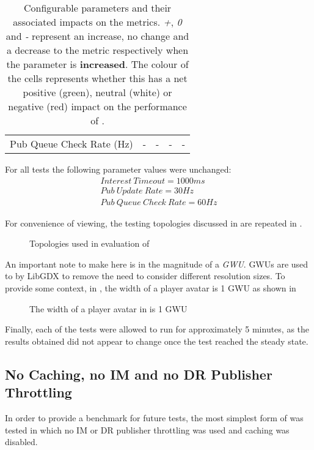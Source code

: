 \begin{table}[H]
\begin{tabular}{@{}lcccc@{}}
    Pub Queue Check Rate (Hz)                      & \cellcolor[HTML]{FFCCC9}-        & \cellcolor[HTML]{FFCCC9}-        & \cellcolor[HTML]{FFCCC9}-               & \cellcolor[HTML]{9AFF99}-                  
    \end{tabular}
    \centering
    \caption{Configurable parameters and their associated impacts on the metrics. \textit{+}, \textit{0} and \textit{-} represent an increase, no change and a decrease to the metric respectively when the parameter is \textbf{increased}. The colour of the cells represents whether this has a net positive (green), neutral (white) or negative (red) impact on the performance of \game{}.}
    \label{tbl:eval:metric-matrix}
\end{table}

For all tests the following parameter values were unchanged:
\begin{gather*}
    Interest\ Timeout = 1000ms\\
    Pub\ Update\ Rate = 30Hz\\
    Pub\ Queue\ Check\ Rate = 60Hz
\end{gather*}

For convenience of viewing, the testing topologies discussed in  are repeated in .

\begin{figure}[H]
    \centering
    \caption{Topologies used in evaluation of \game{}}
    \label{fig:eval:topologies}
\end{figure}

An important note to make here is in the magnitude of a \textit{GWU}. GWUs are used to by LibGDX to remove the need to consider different resolution sizes. To provide some context, in \game{}, the width of a player avatar is 1 GWU as shown in 

\begin{figure}[H]
    \centering
    \caption{The width of a player avatar in \game{} is 1 GWU}
    \label{fig:eval:gwus}
\end{figure}

Finally, each of the tests were allowed to run for approximately 5 minutes, as the results obtained did not appear to change once the test reached the steady state.

\subsection{No Caching, no IM and no DR Publisher Throttling}
In order to provide a benchmark for future tests, the most simplest form of \game{} was tested in which no IM or DR publisher throttling was used and caching was disabled.

